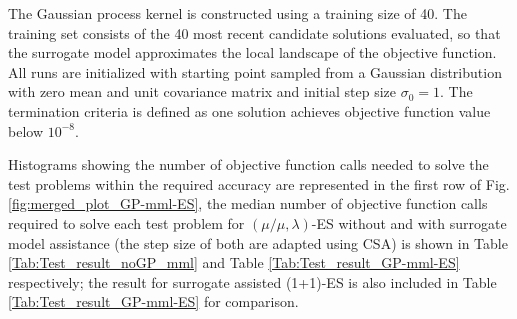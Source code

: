 The Gaussian process kernel is constructed using a training size of 40. The training set consists of the 40 most recent candidate solutions evaluated, so that the surrogate model approximates the local landscape of the objective function. All runs are initialized with starting point sampled from a Gaussian distribution with zero mean and unit covariance matrix and initial step size $\sigma_0=1$. The termination criteria is defined as one solution achieves objective function value below $10^{-8}$.

Histograms showing the number of objective function calls needed to solve the test problems within the required accuracy are represented in the first row of Fig. \ref{fig:merged_plot_GP-mml-ES}, the median number of objective function calls required to solve each test problem for $(\mu/\mu,\lambda)$-ES without and with surrogate model assistance (the step size of both are adapted using CSA) is shown in Table \ref{Tab:Test_result_noGP_mml} and Table \ref{Tab:Test_result_GP-mml-ES} respectively; the result for surrogate assisted (1+1)-ES \cite{DBLP:conf/ppsn/KayhaniA18} is also included in Table \ref{Tab:Test_result_GP-mml-ES} for comparison. 


